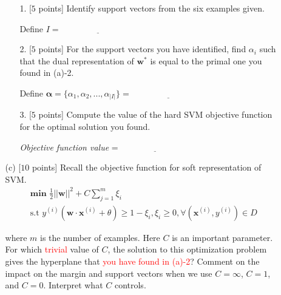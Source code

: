 \begin{enumerate}
\begin{enumerate}
\begin{enumerate}
\item[1.][$5$ points] Identify support vectors from the six examples given.

\vspace{.2in}
Define $I =$ $\underline{\qquad\qquad\qquad\qquad}$
\vspace{.2in}


\item[2.][$5$ points] For the support vectors you have identified, find $\alpha_i$ such that the dual representation of $\mathbf{w}^{*}$ is equal to the primal one you found in (a)-2.

 \vspace{.2in}
Define $\mathbf{\alpha} = \{\alpha_1, \alpha_2, ..., \alpha_{|I|}\} = $ $\underline{\qquad\qquad\qquad\qquad}$
\vspace{.2in}

 \vspace{.2in}

\vspace{.2in}

\item[3.][$5$ points] Compute the value of the hard SVM objective function for the optimal solution you found.


 \vspace{.2in}
\emph{Objective function value} =  $\underline{\qquad\qquad\qquad\qquad}$
\vspace{.2in}
\end{enumerate}

\item[(c)][$10$ points] Recall the objective function for soft representation of SVM.
\begin{gather}
\textbf{min }   \frac{1}{2}||\mathbf{w}||^{2} + C\sum_{j=1}^{m}{\xi_{i}} \\
\text{s.t  } y^{(i)}(\mathbf{w}\cdot\mathbf{x}^{(i)}+\theta)\geq 1 - \xi_{i}, \xi_i\geq0, \forall (\mathbf{x}^{(i)},y^{(i)})\in D
\end{gather}

where $m$ is the number of examples. Here $C$ is an important parameter. For which \textcolor{red}{trivial} value of $C$, the solution to this optimization problem gives the hyperplane that \textcolor{red}{you have found in (a)-2}? Comment on the impact on the margin and support vectors when we use $C = \infty$, $C = 1$, and $C = 0$.	Interpret what $C$ controls. 
\vspace{.7in}

\end{enumerate}


\end{enumerate}
